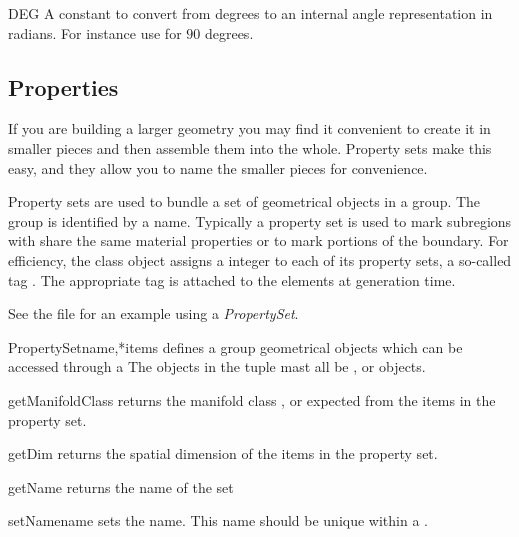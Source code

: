 \begin{datadesc}{DEG}
A constant to convert from degrees to an internal angle representation in radians. For instance use  for $90$ degrees.
\end{datadesc}

\subsection{Properties}

If you are building a larger geometry you may find it convenient to
create it in smaller pieces and then assemble them into the whole. 
Property sets make this easy, and they allow you to name the smaller
pieces for convenience.

Property sets are used to bundle a set of geometrical objects in a
group.  The group is identified by a name.  Typically a property set
is used to mark subregions with share the same material properties or
to mark portions of the boundary.  For efficiency, the \Design class
object assigns a integer to each of its property sets, a so-called tag
.  The appropriate tag is attached to the elements at
generation time.

See the file  for an example using a {\it PropertySet}.


\begin{classdesc}{PropertySet}{name,*items}
defines a group geometrical objects which can be accessed through a 
The objects in the tuple  mast all be \ManifoldOneD, \ManifoldTwoD or \ManifoldThreeD objects.
\end{classdesc}


\begin{methoddesc}[PropertySet]{getManifoldClass}{}
returns the manifold class \ManifoldOneD, \ManifoldTwoD or \ManifoldThreeD expected from the items
in the property set.
\end{methoddesc}

\begin{methoddesc}[PropertySet]{getDim}{}
returns the spatial dimension of the items
in the property set. 
\end{methoddesc}

\begin{methoddesc}[PropertySet]{getName}{}
returns the name of the set
\end{methoddesc}

\begin{methoddesc}[PropertySet]{setName}{name}
sets the name. This name should be unique within a \Design.
\end{methoddesc}

